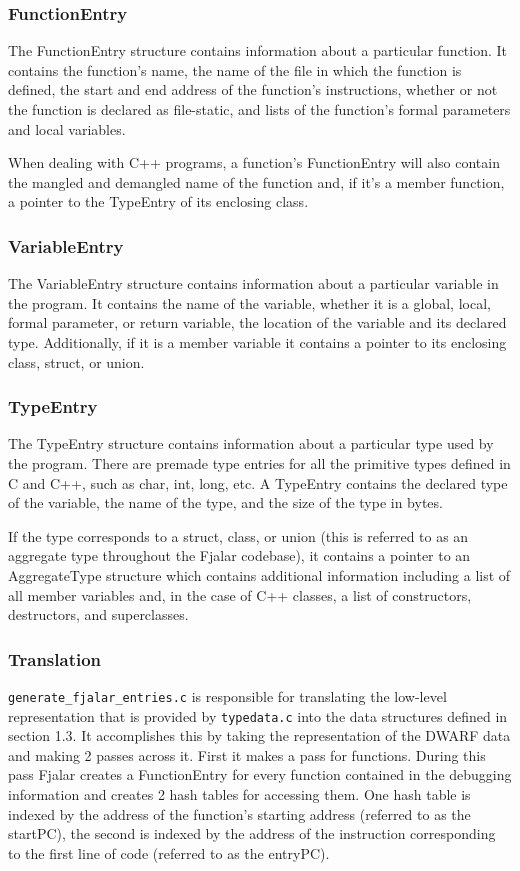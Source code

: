 \documentclass{article}
\begin{document}
\subsubsection{FunctionEntry}
The FunctionEntry structure contains information about a particular
function. It contains the function's name, the name of the file in which  
the function is defined, the start and end address of the function's 
instructions, whether or not the function is declared as file-static,
and lists of the function's formal parameters and local variables. 

When dealing with C++ programs, a function's FunctionEntry will also  
contain the mangled and demangled name of the function and, if it's a
member function, a pointer to the TypeEntry of its enclosing class.

\subsubsection{VariableEntry}
The VariableEntry structure contains information about a particular
variable in the program. It contains the name of the variable, whether
it is a global, local, formal parameter, or return variable, the
location of the variable and its declared type. Additionally,
if it is a member variable it contains a pointer to its enclosing
class, struct, or union.

\subsubsection{TypeEntry}
The TypeEntry structure contains information about a particular type used
by the program. There are premade type entries for all the primitive
types defined in C and C++, such as char, int, long, etc.
A TypeEntry contains  the
declared type of the variable, the name of the type, and the size of
the type in bytes.

If the type corresponds to a struct, class, or union (this is referred to
as an aggregate type throughout the Fjalar codebase), it contains a pointer
to an AggregateType structure which contains additional information
including a list of all member variables and, in the case of C++
classes, a list of constructors, destructors, and superclasses.

\subsubsection{Translation}
\texttt{generate\_fjalar\_entries.c} is responsible for translating
the low-level representation that is 
provided by \texttt{typedata.c} into the
data structures defined in section 1.3. It
accomplishes this by taking the representation of the DWARF data and
making 2 passes across it. First it makes a pass for functions. During
this pass Fjalar creates a FunctionEntry for every function contained
in the debugging information and creates 2 hash tables for accessing
them. One hash table is indexed by the address of the function's
starting address (referred to as the startPC), the second is indexed
by the address of the instruction corresponding to the first line of
code (referred to as the entryPC).
\end{document}
